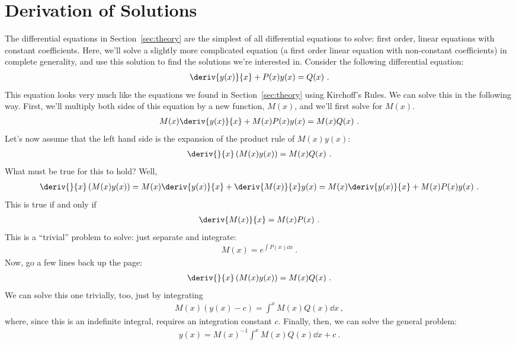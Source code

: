 \documentclass[12pt]{article}
\begin{document}
\appendix

\section{Derivation of Solutions}
\label{sec:solutions}

The differential equations in Section~\ref{sec:theory} are the
simplest of all differential equations to solve: first order, linear
equations with constant coefficients.  Here, we'll solve a slightly
more complicated equation (a first order linear equation with
non-constant coefficients) in complete generality, and use this
solution to find the solutions we're interested in.  Consider the
following differential equation:
\begin{gather*}
  \deriv{y(x)}{x} + P(x) y(x) = Q(x)\ .
\end{gather*}
This equation looks very much like the equations we found in
Section~\ref{sec:theory} using Kirchoff's Rules.  We can solve this in
the following way.  First, we'll multiply both sides of this equation
by a new function, $M(x)$, and we'll first solve for $M(x)$.
\begin{gather*}
  M(x) \deriv{y(x)}{x} + M(x) P(x) y(x) = M(x) Q(x)\ .
\end{gather*}
Let's now assume that the left hand side is the expansion of the
product rule of $M(x) y(x)$:
\begin{gather*}
  \deriv{}{x} \left( M(x) y(x) \right) = M(x) Q(x)\ .
\end{gather*}
What must be true for this to hold?  Well,
\begin{gather*}
  \deriv{}{x} \left( M(x) y(x) \right) = 
  M(x) \deriv{y(x)}{x} + \deriv{M(x)}{x} y(x) = 
  M(x) \deriv{y(x)}{x} + M(x) P(x) y(x)\ .
\end{gather*}
This is true if and only if
\begin{gather*}
  \deriv{M(x)}{x} = M(x) P(x)\ .
\end{gather*}
This is a ``trivial'' problem to solve: just separate and integrate:
\begin{gather*}
  M(x) = e^{\int P(x) \dd x}\ .
\end{gather*}
Now, go a few lines back up the page:
\begin{gather*}
  \deriv{}{x} \left( M(x) y(x) \right) = M(x) Q(x)\ .
\end{gather*}
We can solve this one trivially, too, just by integrating
\begin{gather*}
  M(x) \left( y(x) -c \right) = \int^x M(x) Q(x) \dd x\ ,
\end{gather*}
where, since this is an indefinite integral, requires an integration
constant $c$.  Finally, then, we can solve the general problem:
\begin{gather*}
  y(x) = M(x)^{-1} \int^x M(x) Q(x) \dd x + c\ .
\end{gather*}
\end{document}

